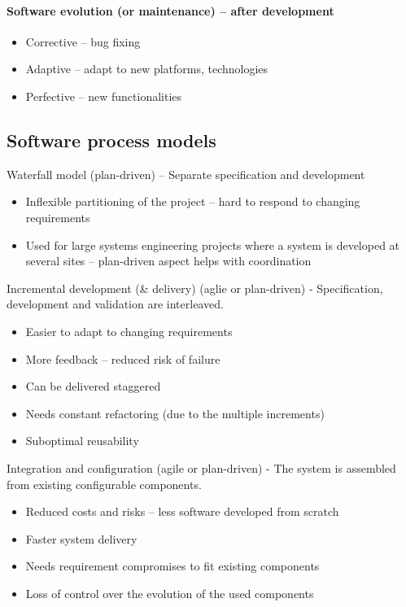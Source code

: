 \documentclass[../ESOF_notes.tex]{subfiles}
\begin{document}
\paragraph{Software evolution (or maintenance) – after development}
\begin{itemize}
    \item Corrective – bug fixing
    \item Adaptive – adapt to new platforms, technologies
    \item Perfective – new functionalities
\end{itemize}

\subsection{Software process models}
Waterfall model (plan-driven) – Separate specification and development

\begin{itemize}
    \item Inflexible partitioning of the project – hard to respond to changing requirements
    \item Used for large systems engineering projects where a system is developed at several sites – plan-driven aspect helps with coordination
\end{itemize}

Incremental development (\& delivery) (aglie or plan-driven) - Specification, development and validation are interleaved.

\begin{itemize}
    \item Easier to adapt to changing requirements
    \item More feedback – reduced risk of failure
    \item Can be delivered staggered
    \item Needs constant refactoring (due to the multiple increments)
    \item Suboptimal reusability
\end{itemize}
Integration and configuration (agile or plan-driven) - The system is assembled from existing configurable components.

\begin{itemize}
    \item Reduced costs and risks – less software developed from scratch
    \item Faster system delivery
    \item Needs requirement compromises to fit existing components
    \item Loss of control over the evolution of the used components
\end{itemize}
\end{document}
